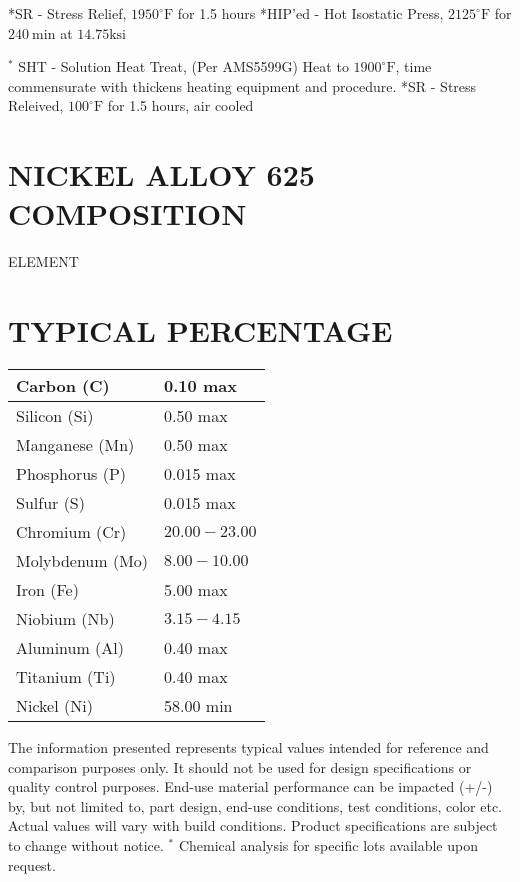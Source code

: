 \documentclass[10pt]{article}
\begin{document}
*SR - Stress Relief, $1950^{\circ} \mathrm{F}$ for 1.5 hours *HIP'ed - Hot Isostatic Press, $2125^{\circ} \mathrm{F}$ for $240 \mathrm{~min}$ at $14.75 \mathrm{ksi}$

${ }^{*}$ SHT - Solution Heat Treat, (Per AMS5599G) Heat to $1900^{\circ} \mathrm{F}$, time commensurate with thickens heating equipment and procedure. *SR - Stress Releived, $100^{\circ} \mathrm{F}$ for 1.5 hours, air cooled

\section*{NICKEL ALLOY 625 COMPOSITION}
ELEMENT

\section*{TYPICAL PERCENTAGE}
\begin{center}
\begin{tabular}{|l|l|}
\hline
Carbon (C) & 0.10 max \\
\hline
Silicon (Si) & 0.50 max \\
\hline
Manganese (Mn) & 0.50 max \\
\hline
Phosphorus (P) & 0.015 max \\
\hline
Sulfur (S) & 0.015 max \\
\hline
Chromium (Cr) & $20.00-23.00$ \\
\hline
Molybdenum (Mo) & $8.00-10.00$ \\
\hline
Iron (Fe) & 5.00 max \\
\hline
Niobium (Nb) & $3.15-4.15$ \\
\hline
Aluminum (Al) & 0.40 max \\
\hline
Titanium (Ti) & 0.40 max \\
\hline
Nickel (Ni) & 58.00 min \\
\hline
\end{tabular}
\end{center}

The information presented represents typical values intended for reference and comparison purposes only. It should not be used for design specifications or quality control purposes. End-use material performance can be impacted (+/-) by, but not limited to, part design, end-use conditions, test conditions, color etc. Actual values will vary with build conditions. Product specifications are subject to change without notice. ${ }^{*}$ Chemical analysis for specific lots available upon request.
\end{document}
